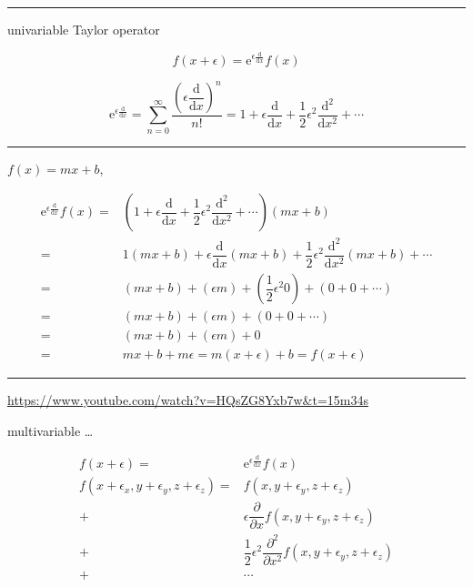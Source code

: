 \documentclass[
]{book}
\theoremstyle{definition}
\theoremstyle{definition}
\theoremstyle{definition}
\theoremstyle{definition}
\theoremstyle{remark}
\begin{document}
\begin{center}\rule{0.5\linewidth}{0.5pt}\end{center}

univariable Taylor operator

\[
f\left(x+\epsilon\right)=\mathrm{e}^{{\scriptscriptstyle \epsilon\frac{\mathrm{d}}{\mathrm{d}x}}}f\left(x\right)
\]

\[
\mathrm{e}^{{\scriptscriptstyle \epsilon\frac{\mathrm{d}}{\mathrm{d}x}}}=\sum\limits _{n=0}^{\infty}\frac{\left(\epsilon\dfrac{\mathrm{d}}{\mathrm{d}x}\right)^{n}}{n!}=1+\epsilon\dfrac{\mathrm{d}}{\mathrm{d}x}+\dfrac{1}{2}\epsilon^{2}\dfrac{\mathrm{d}^{2}}{\mathrm{d}x^{2}}+\cdots
\]

\begin{center}\rule{0.5\linewidth}{0.5pt}\end{center}

\(f\left(x\right)=mx+b\),

\[
\begin{aligned}
\mathrm{e}^{{\scriptscriptstyle \epsilon\frac{\mathrm{d}}{\mathrm{d}x}}}f\left(x\right)= & \left(1+\epsilon\dfrac{\mathrm{d}}{\mathrm{d}x}+\dfrac{1}{2}\epsilon^{2}\dfrac{\mathrm{d}^{2}}{\mathrm{d}x^{2}}+\cdots\right)\left(mx+b\right)\\
= & 1\left(mx+b\right)+\epsilon\dfrac{\mathrm{d}}{\mathrm{d}x}\left(mx+b\right)+\dfrac{1}{2}\epsilon^{2}\dfrac{\mathrm{d}^{2}}{\mathrm{d}x^{2}}\left(mx+b\right)+\cdots\\
= & \left(mx+b\right)+\left(\epsilon m\right)+\left(\dfrac{1}{2}\epsilon^{2}0\right)+\left(0+0+\cdots\right)\\
= & \left(mx+b\right)+\left(\epsilon m\right)+\left(0+0+\cdots\right)\\
= & \left(mx+b\right)+\left(\epsilon m\right)+0\\
= & mx+b+m\epsilon=m\left(x+\epsilon\right)+b=f\left(x+\epsilon\right)
\end{aligned}
\]

\begin{center}\rule{0.5\linewidth}{0.5pt}\end{center}

\url{https://www.youtube.com/watch?v=HQsZG8Yxb7w&t=15m34s}

multivariable \ldots{}

\[
\begin{aligned}
f\left(x+\epsilon\right)= & \mathrm{e}^{{\scriptscriptstyle \epsilon\frac{\mathrm{d}}{\mathrm{d}x}}}f\left(x\right)\\
f\left(x+\epsilon_{{\scriptscriptstyle x}},y+\epsilon_{{\scriptscriptstyle y}},z+\epsilon_{{\scriptscriptstyle z}}\right)= & f\left(x,y+\epsilon_{{\scriptscriptstyle y}},z+\epsilon_{{\scriptscriptstyle z}}\right)\\
+ & \epsilon\dfrac{\partial}{\partial x}f\left(x,y+\epsilon_{{\scriptscriptstyle y}},z+\epsilon_{{\scriptscriptstyle z}}\right)\\
+ & \dfrac{1}{2}\epsilon^{2}\dfrac{\partial^{2}}{\partial x^{2}}f\left(x,y+\epsilon_{{\scriptscriptstyle y}},z+\epsilon_{{\scriptscriptstyle z}}\right)\\
+ & \cdots
\end{aligned}
\]
\end{document}
